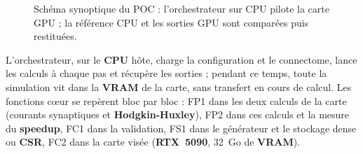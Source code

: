 \documentclass{report}
\begin{document}
\begin{figure}[H]
{}%
\caption{Schéma synoptique du POC : l'orchestrateur sur CPU pilote la carte GPU ; la référence CPU et les sorties GPU sont comparées puis restituées.}
\label{fig:syno}
\end{figure}

L'orchestrateur, sur le \textbf{CPU} hôte, charge la configuration et le connectome, lance les calculs à chaque pas et récupère les sorties ; pendant ce temps, toute la simulation vit dans la \textbf{VRAM} de la carte, sans transfert en cours de calcul. Les fonctions cœur se repèrent bloc par bloc : FP1 dans les deux calculs de la carte (courants synaptiques et \textbf{Hodgkin-Huxley}), FP2 dans ces calculs et la mesure du \textbf{speedup}, FC1 dans la validation, FS1 dans le générateur et le stockage dense ou \textbf{CSR}, FC2 dans la carte visée (\textbf{RTX~5090}, 32~Go de \textbf{VRAM}).
\end{document}
